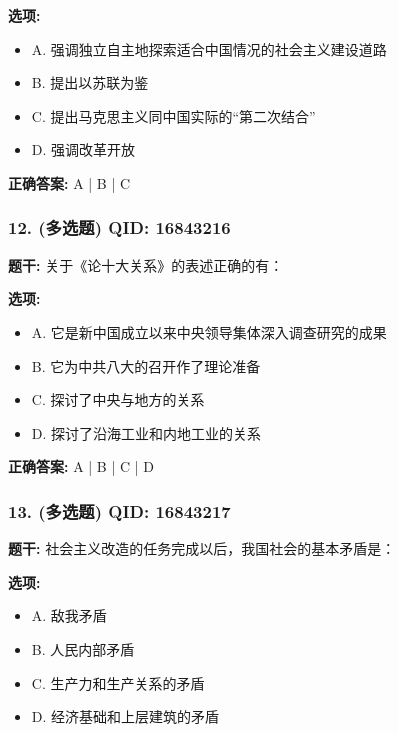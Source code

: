 \documentclass[12pt,UTF8]{ctexart}
\begin{document}
\textbf{选项:}
\begin{itemize}[leftmargin=*]

  \item A. 强调独立自主地探索适合中国情况的社会主义建设道路

  \item B. 提出以苏联为鉴

  \item C. 提出马克思主义同中国实际的“第二次结合”

  \item D. 强调改革开放

\end{itemize}

\textbf{正确答案:}
A | B | C

\vspace{0.3em}\hrulefill\vspace{0.7em}

\subsubsection*{12. (多选题) \small QID: 16843216}

\textbf{题干:}
关于《论十大关系》的表述正确的有：

\textbf{选项:}
\begin{itemize}[leftmargin=*]

  \item A. 它是新中国成立以来中央领导集体深入调查研究的成果

  \item B. 它为中共八大的召开作了理论准备

  \item C. 探讨了中央与地方的关系

  \item D. 探讨了沿海工业和内地工业的关系

\end{itemize}

\textbf{正确答案:}
A | B | C | D

\vspace{0.3em}\hrulefill\vspace{0.7em}

\subsubsection*{13. (多选题) \small QID: 16843217}

\textbf{题干:}
社会主义改造的任务完成以后，我国社会的基本矛盾是：

\textbf{选项:}
\begin{itemize}[leftmargin=*]

  \item A. 敌我矛盾

  \item B. 人民内部矛盾

  \item C. 生产力和生产关系的矛盾

  \item D. 经济基础和上层建筑的矛盾

\end{itemize}
\end{document}
